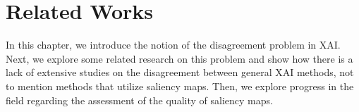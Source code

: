 \chapter{Related Works}
\label{ch:relatedWorks}
In this chapter, we introduce the notion of the disagreement problem in XAI. Next, we explore some related research on this problem and show how there is a lack of extensive studies on the disagreement between general XAI methods, not to mention methods that utilize saliency maps. Then, we explore progress in the field regarding the assessment of the quality of saliency maps.



